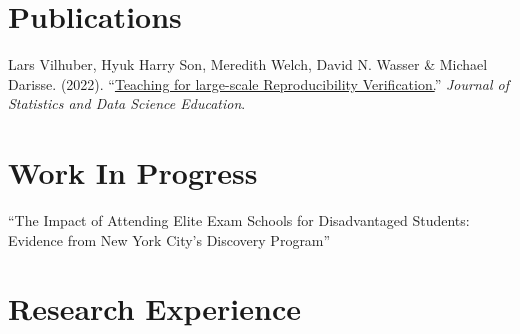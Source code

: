 \documentclass[letterpaper]{article}
\renewenvironment{itemize}{
  \begin{list}{}{
    \setlength{\leftmargin}{1.5em}
  }
}{
  \end{list}
}
\begin{document}
\section*{Publications}

\begin{itemize}
    \item Lars Vilhuber, Hyuk Harry Son, Meredith Welch, David N. Wasser \& Michael Darisse. (2022). ``\href{https://www.tandfonline.com/doi/full/10.1080/26939169.2022.2074582}{Teaching for large-scale Reproducibility Verification.}'' \textit{Journal of Statistics and Data Science Education}.
\end{itemize}

\section*{Work In Progress}

\begin{itemize}
    \item ``The Impact of Attending Elite Exam Schools for Disadvantaged Students: Evidence from New York City's Discovery Program''
    
\end{itemize}


\section*{Research Experience}
\end{document}
